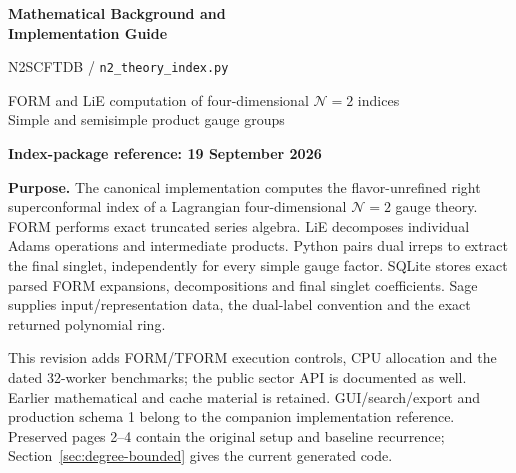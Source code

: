 \documentclass[11pt,a4paper]{article}
\begin{document}
\begin{center}
{\Large\sffamily\bfseries Mathematical Background and\\ Implementation Guide}\par
{\large N2SCFTDB / \texttt{n2\_theory\_index.py}}\par
FORM and LiE computation of four-dimensional $\mathcal N=2$ indices\\
Simple and semisimple product gauge groups\par
\textbf{Index-package reference: 19 September 2026}
\end{center}
\vspace{3mm}
\textbf{Purpose.} The canonical implementation computes the flavor-unrefined right
superconformal index of a Lagrangian four-dimensional $\mathcal N=2$ gauge theory.
FORM performs exact truncated series algebra. LiE decomposes individual Adams
operations and intermediate products. Python pairs dual irreps to extract the
final singlet, independently for every simple gauge factor. SQLite stores exact
parsed FORM expansions, decompositions and final singlet coefficients. Sage supplies input/representation
data, the dual-label convention and the exact returned polynomial ring.

This revision adds FORM/TFORM execution controls, CPU allocation and the
dated 32-worker benchmarks; the public sector API is documented as well.
Earlier mathematical and cache material is retained. GUI/search/export and
production schema 1 belong to the companion implementation reference.
Preserved pages 2--4 contain the original setup and baseline recurrence;
Section~\ref{sec:degree-bounded} gives the current generated code.
\end{document}
